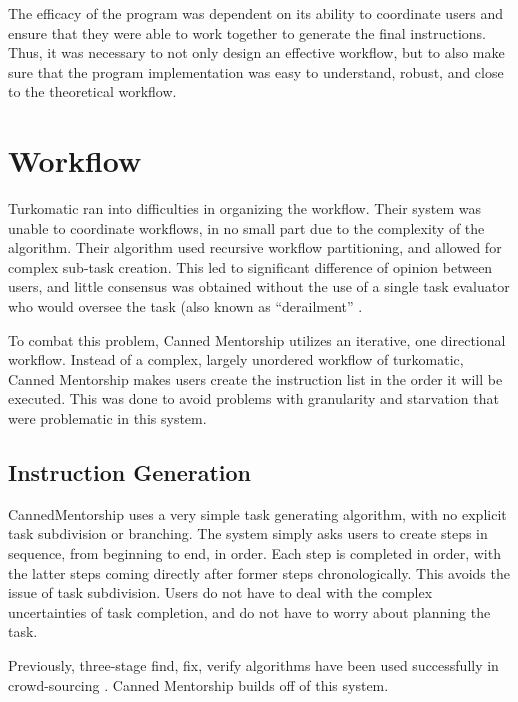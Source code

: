 The efficacy of the program was dependent on its ability to coordinate users and ensure that they were able to work together to generate the final instructions.
Thus, it was necessary to not only design an effective workflow, but to also make sure that the program implementation was easy to understand, robust, and close to the theoretical workflow.

\section{Workflow}
Turkomatic ran into difficulties in organizing the workflow. 
Their system was unable to coordinate workflows, in no small part due to the complexity of the algorithm.
Their algorithm used recursive workflow partitioning, and allowed for complex sub-task creation.
This led to significant difference of opinion between users, and little consensus was obtained without the use of a single task evaluator who would oversee the task (also known as ``derailment'' \cite{kulkarni2012collaboratively}.

To combat this problem, Canned Mentorship utilizes an iterative, one directional workflow.
Instead of a complex, largely unordered workflow of turkomatic, Canned Mentorship makes users create the instruction list in the order it will be executed.
This was done to avoid problems with granularity and starvation that were problematic in this system.

\subsection{Instruction Generation}
CannedMentorship uses a very simple task generating algorithm, with no explicit task subdivision or branching.
The system simply asks users to create steps in sequence, from beginning to end, in order.
Each step is completed in order, with the latter steps coming directly after former steps chronologically.
This avoids the issue of task subdivision. 
Users do not have to deal with the complex uncertainties of task completion, and do not have to worry about planning the task.

Previously, three-stage find, fix, verify algorithms have been used successfully in crowd-sourcing \cite{kim2013toolscape,bernstein2010soylent}. Canned Mentorship builds off of this system. 

